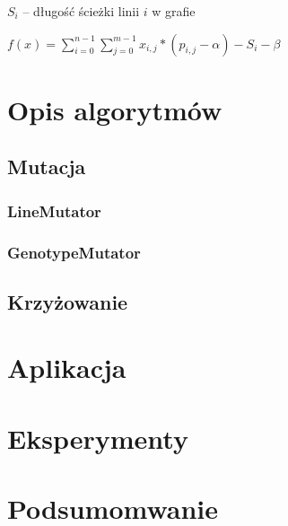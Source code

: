 \documentclass[12pt,a4paper,openright]{mwrep}
\begin{document}
$S_{i}$ -- długość ścieżki linii $i$ w grafie

$f(x) = \sum_{i=0}^{n-1} \sum_{j=0}^{m-1} x_{i,j} * (p_{i,j}-\alpha)-S_{i}-\beta$


\chapter{Opis algorytmów}

\section{Mutacja}

\subsection{LineMutator}

\subsection{GenotypeMutator}

\section{Krzyżowanie}


\chapter{Aplikacja}

\chapter{Eksperymenty}

\chapter{Podsumomwanie}
\end{document}

